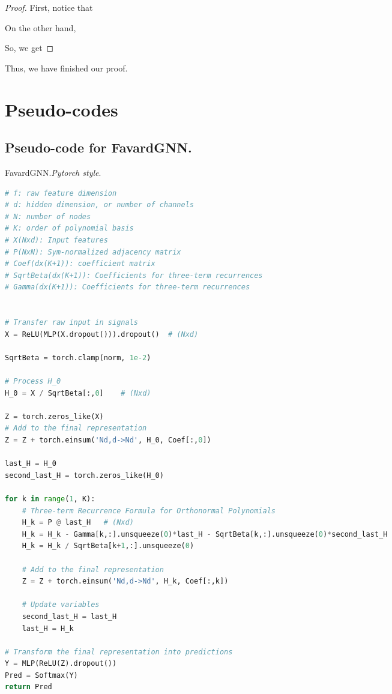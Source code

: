 \begin{proof}
    First, notice that
    
    On the other hand, 
    
    So, we get 
    
\end{proof}

Thus, we have finished our proof.
\vspace{100mm}
 

\section{Pseudo-codes}


\subsection{Pseudo-code for FavardGNN.}
\label{sec:pseudo_torch_Favard}
\begin{algorithm}[H]
\caption{FavardGNN.\textit{Pytorch style}.}
\label{alg:cotextde}
\begin{lstlisting}[language=python]
# f: raw feature dimension
# d: hidden dimension, or number of channels
# N: number of nodes
# K: order of polynomial basis
# X(Nxd): Input features 
# P(NxN): Sym-normalized adjacency matrix 
# Coef(dx(K+1)): coefficient matrix
# SqrtBeta(dx(K+1)): Coefficients for three-term recurrences 
# Gamma(dx(K+1)): Coefficients for three-term recurrences 


# Transfer raw input in signals 
X = ReLU(MLP(X.dropout())).dropout()  # (Nxd)

SqrtBeta = torch.clamp(norm, 1e-2)

# Process H_0
H_0 = X / SqrtBeta[:,0]    # (Nxd)

Z = torch.zeros_like(X)
# Add to the final representation
Z = Z + torch.einsum('Nd,d->Nd', H_0, Coef[:,0])  

last_H = H_0
second_last_H = torch.zeros_like(H_0)

for k in range(1, K):
    # Three-term Recurrence Formula for Orthonormal Polynomials
    H_k = P @ last_H   # (Nxd)
    H_k = H_k - Gamma[k,:].unsqueeze(0)*last_H - SqrtBeta[k,:].unsqueeze(0)*second_last_H
    H_k = H_k / SqrtBeta[k+1,:].unsqueeze(0)

    # Add to the final representation
    Z = Z + torch.einsum('Nd,d->Nd', H_k, Coef[:,k])

    # Update variables
    second_last_H = last_H
    last_H = H_k

# Transform the final representation into predictions
Y = MLP(ReLU(Z).dropout())
Pred = Softmax(Y)
return Pred
\end{lstlisting}
\end{algorithm} 
